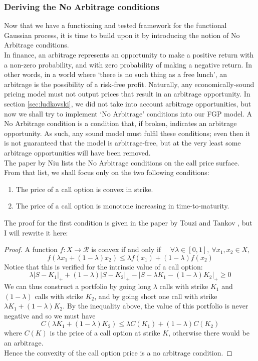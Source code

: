 \documentclass[a4paper,12pt]{article}
\begin{document}
\subsubsection{Deriving the No Arbitrage conditions \label{sec:na_cond_proof}}
Now that we have a functioning and tested framework for the functional Gaussian process, it is time to build upon it by introducing the notion of No Arbitrage conditions.\\
In finance, an arbitrage represents an opportunity to make a positive return with a non-zero probability, and with zero probability of making a negative return. In other words, in a world where `there is no such thing as a free lunch', an arbitrage is the possibility of a risk-free profit. Naturally, any economically-sound pricing model must not output prices that result in an arbitrage opportunity. In section \ref{sec:ludkovski}, we did not take into account arbitrage opportunities, but now we shall try to implement `No Arbitrage' conditions into our FGP model. A No Arbitrage condition is a condition that, if broken, indicates an arbitrage opportunity. As such, any sound model must fulfil these conditions; even then it is not guaranteed that the model is arbitrage-free, but at the very least some arbitrage opportunities will have been removed.\\
The paper by Niu \cite{NA_cond_all} lists the No Arbitrage conditions on the call price surface. From that list, we shall focus only on the two following conditions:
\begin{enumerate}
    \item The price of a call option is convex in strike.
    \item The price of a call option is monotone increasing in time-to-maturity.
\end{enumerate}
The proof for the first condition is given in the paper by Touzi and Tankov \cite{NA_cond_K}, but I will rewrite it here:
\begin{proof}
A function $f : X \rightarrow \mathcal{R}$ is convex if and only if $\quad \forall \lambda \in [0, 1],\ \forall x_1, x_2 \in X,$ $$ f(\lambda x_1 + (1-\lambda) x_2) \leq \lambda f(x_1) + (1-\lambda) f(x_2)$$
Notice that this is verified for the intrinsic value of a call option: 
$$\lambda |S-K_1|_{+} + (1-\lambda) |S-K_2|_{+} - |S-\lambda K_1 - (1-\lambda) K_2|_{+} \geq 0 $$
We can thus construct a portfolio by going long $\lambda$ calls with strike $K_1$ and $(1-\lambda)$ calls with strike $K_2$, and by going short one call with strike $\lambda K_1 + (1-\lambda) K_2$. By the inequality above, the value of this portfolio is never negative and so we must have 
$$C(\lambda K_1 + (1-\lambda) K_2) \leq \lambda C(K_1) + (1-\lambda) C(K_2)$$
where $C(K)$ is the price of a call option at strike $K$, otherwise there would be an arbitrage.\\
Hence the convexity of the call option price is a no arbitrage condition.
\end{proof}
\end{document}
